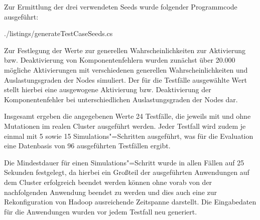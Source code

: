 Zur Ermittlung der drei verwendeten Seeds wurde folgender Programmcode ausgeführt:


{./listings/generateTestCaseSeeds.cs}

Zur Festlegung der Werte zur generellen Wahrscheinlichkeiten zur Aktivierung bzw. Deaktivierung von Komponentenfehlern wurden zunächst über 20.000 mögliche Aktivierungen mit verschiedenen generellen Wahrscheinlichkeiten und Auslastungsgraden der Nodes simuliert.
Der für die Testfälle ausgewählte Wert stellt hierbei eine ausgewogene Aktivierung bzw. Deaktivierung der Komponentenfehler bei unterschiedlichen Auslastungsgraden der Nodes dar.

Insgesamt ergeben die angegebenen Werte 24 Testfälle, die jeweils mit und ohne Mutationen im realen Cluster ausgeführt werden.
Jeder Testfall wird zudem je einmal mit 5 sowie 15 Simulations"=Schritten ausgeführt, was für die Evaluation eine Datenbasis von 96 ausgeführten Testfällen ergibt.

Die Mindestdauer für einen Simulations"=Schritt wurde in allen Fällen auf 25 Sekunden festgelegt, da hierbei ein Großteil der ausgeführten Anwendungen auf dem Cluster erfolgreich beendet werden können ohne vorab von der nachfolgenden Anwendung beendet zu werden und dies auch eine zur Rekonfiguration von Hadoop ausreichende Zeitspanne darstellt.
Die Eingabedaten für die Anwendungen wurden vor jedem Testfall neu generiert.

